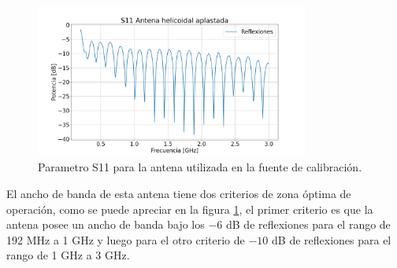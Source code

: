\begin{figure}
    \centering
    \includegraphics[width=0.8\textwidth]{img/s11Paleta}
    \caption{Parametro S11 para la antena utilizada en la fuente de calibración.}
    \label{fig:s11estrella}
\end{figure}

El ancho de banda de esta antena tiene dos criterios de zona óptima de operación, como se puede apreciar en la figura \ref{fig:s11estrella}, el primer criterio es que la antena posee un ancho de banda bajo los $-6$ dB de reflexiones para el rango de 192 MHz a 1 GHz y luego para el otro criterio de $-10$ dB de reflexiones para el rango de 1 GHz a 3 GHz.\\

